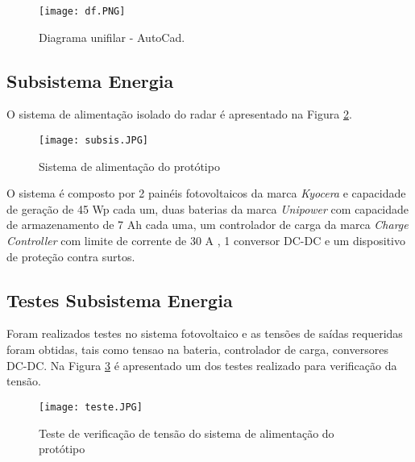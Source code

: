 \begin{figure}[H]
\centering
\texttt{[image: df.PNG]}
\caption{Diagrama unifilar - AutoCad.}
\label{fig:diagrama}
\end{figure}



\subsection{Subsistema Energia}

O sistema de alimentação isolado do radar é apresentado na Figura \ref{fig:su}.

\begin{figure}[H]
\centering
\texttt{[image: subsis.JPG]}

\caption{\label{fig:su}Sistema de alimentação do protótipo}
\end{figure}

O sistema é composto por 2 painéis fotovoltaicos da marca \textit{Kyocera} e capacidade de geração de 45 Wp cada um, duas baterias da marca \textit{Unipower} com capacidade de armazenamento de 7 Ah cada uma, um controlador de carga da marca \textit{Charge Controller} com limite de corrente de 30 A , 1 conversor DC-DC e um dispositivo de proteção contra surtos.

\subsection{Testes Subsistema Energia}

Foram realizados testes no sistema fotovoltaico e as tensões de saídas requeridas foram obtidas, tais como tensao na bateria, controlador de carga, conversores DC-DC. Na Figura \ref{fig:teste} é apresentado um dos testes realizado para verificação da tensão.

\begin{figure}[H]
\centering
\texttt{[image: teste.JPG]}

\caption{\label{fig:teste}Teste de verificação de tensão do sistema de alimentação do protótipo}
\end{figure}




